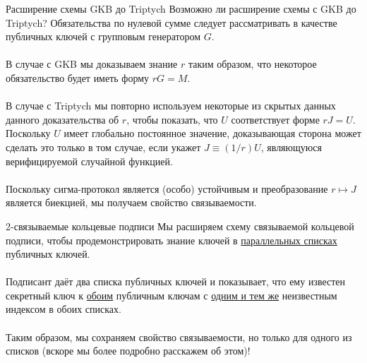 \documentclass[aspectratio=169]{beamer}
\begin{document}
\begin{frame}{Расширение схемы GKB до Triptych}
Возможно ли расширение схемы с GKB до Triptych? Обязательства по нулевой сумме следует рассматривать в качестве публичных ключей с групповым генератором $G$.
\\~\\
В случае с GKB мы доказываем знание $r$ таким образом, что некоторое обязательство будет иметь форму $rG = M$.
\\~\\
В случае с Triptych мы повторно используем некоторые из скрытых данных данного доказательства об $r$, чтобы показать, что $U$ соответствует форме $rJ = U$. Поскольку $U$ имеет глобально постоянное значение, доказывающая сторона может сделать это только в том случае, если укажет $J \equiv (1/r)U$, являющуюся верифицируемой случайной функцией.
\\~\\
Поскольку сигма-протокол является (особо) устойчивым и преобразование $r \mapsto J$ является биекцией, мы получаем свойство связываемости.
\end{frame}


\begin{frame}{2-связываемые кольцевые подписи}
Мы расширяем схему связываемой кольцевой подписи, чтобы продемонстрировать знание ключей в \underline{параллельных списках} публичных ключей.
\\~\\
Подписант даёт два списка публичных ключей и показывает, что ему известен секретный ключ к \underline{обоим} публичным ключам с \underline{одним и тем же} неизвестным индексом в обоих списках.
\\~\\
Таким образом, мы сохраняем свойство связываемости, но только для одного из списков (вскоре мы более подробно расскажем об этом)!
\end{frame}
\end{document}
